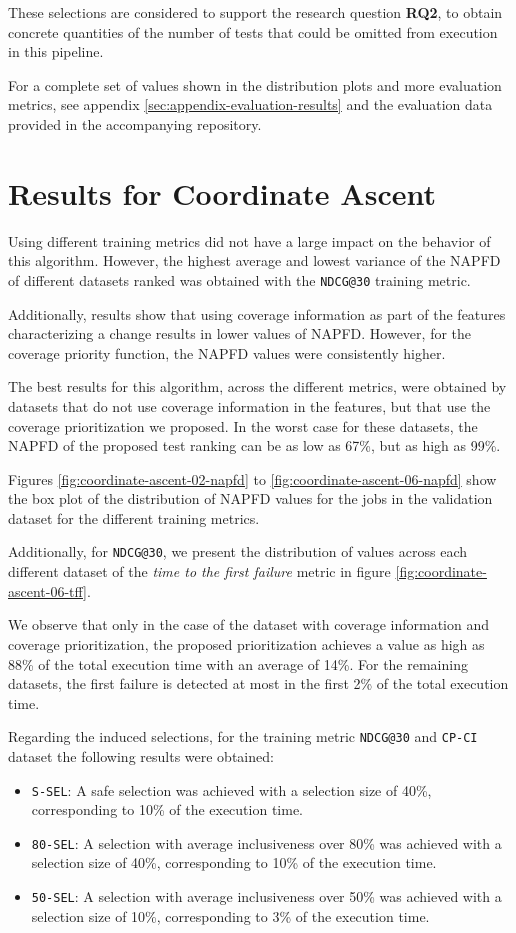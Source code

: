 These selections are considered to support the research question \textbf{RQ2}, to obtain
concrete quantities of the number of tests that could be omitted from execution
in this pipeline.

For a complete set of values shown in the distribution plots and more evaluation metrics, see appendix \ref{sec:appendix-evaluation-results}
and the evaluation data provided in the accompanying repository.

\section{Results for Coordinate Ascent}

Using different training metrics did not have a large impact on the behavior of this algorithm. 
However, the highest average and lowest variance of the NAPFD of different datasets ranked was obtained with the 
\texttt{NDCG@30} training metric.

Additionally, results show that using coverage information as part of the features characterizing a change
results in lower values of NAPFD. However, for the coverage priority function, the NAPFD values were 
consistently higher.

The best results for this algorithm, across the different metrics, were obtained by datasets that do not
use coverage information in the features, but that use the coverage prioritization we proposed. In the worst case
for these datasets, the NAPFD of the proposed test ranking can be as low as 67\%, but as high as 99\%.

Figures \ref{fig:coordinate-ascent-02-napfd} to \ref{fig:coordinate-ascent-06-napfd} show the box plot of the distribution
of NAPFD values for the jobs in the validation dataset for the different training metrics. 

Additionally, for \texttt{NDCG@30}, we present the distribution of values 
across each different dataset of the \emph{time to the first failure} metric in figure \ref{fig:coordinate-ascent-06-tff}. 

We observe that only in the case of the dataset with coverage information and coverage prioritization, the proposed prioritization
achieves a value as high as 88\% of the total execution time with an average of 14\%. For the remaining datasets, the first failure is detected
at most in the first 2\% of the total execution time.

Regarding the induced selections, for the training metric \texttt{NDCG@30} and \texttt{CP-CI} dataset the following results were obtained:
\begin{itemize}
    \item \texttt{S-SEL}: A safe selection was achieved with a selection size of 40\%, corresponding to 10\% of the execution time.
    \item \texttt{80-SEL}: A selection with average inclusiveness over 80\% was achieved with a selection size of 40\%, corresponding to 10\% of the execution time.
    \item \texttt{50-SEL}: A selection with average inclusiveness over 50\% was achieved with a selection size of 10\%, corresponding to 3\% of the execution time.
\end{itemize}


